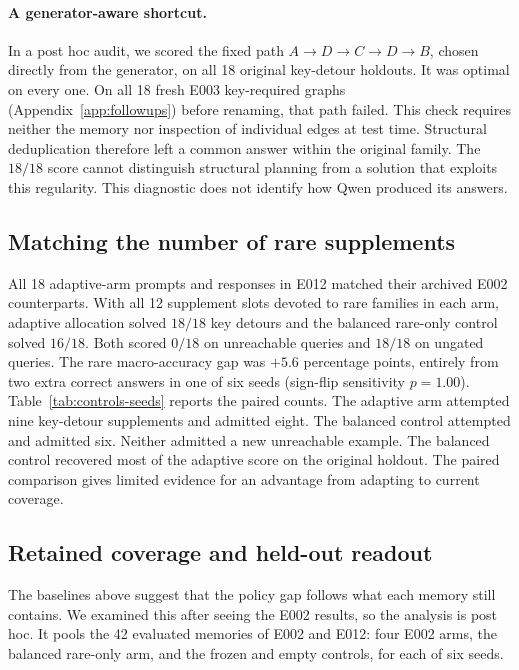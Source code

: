 \documentclass[11pt]{article}
\begin{document}
\paragraph{A generator-aware shortcut.} In a post hoc audit, we
scored the fixed path $A\to D\to C\to D\to B$, chosen directly
from the generator, on all 18 original key-detour holdouts. It was
optimal on every one. On all 18 fresh E003 key-required graphs
(Appendix~\ref{app:followups})
before renaming, that path failed. This check requires neither the
memory nor inspection of individual edges at test time. Structural
deduplication therefore left a common answer within the original
family. The $18/18$ score cannot distinguish structural planning
from a solution that exploits this regularity. This diagnostic
does not identify how Qwen produced its answers.

\subsection{Matching the number of rare supplements}

All 18 adaptive-arm prompts and responses in E012 matched their
archived E002 counterparts. With all
12 supplement slots devoted to rare families in each arm, adaptive
allocation solved $18/18$ key detours and the balanced rare-only
control solved $16/18$. Both scored $0/18$ on unreachable queries
and $18/18$ on ungated queries. The rare macro-accuracy gap was
$+5.6$ percentage points, entirely from two extra correct answers
in one of six seeds (sign-flip sensitivity $p=1.00$).
Table~\ref{tab:controls-seeds} reports the paired counts. The adaptive
arm attempted nine key-detour supplements and admitted eight.
The balanced control attempted and admitted six. Neither admitted a
new unreachable example. The balanced control recovered most of the
adaptive score on the original holdout. The paired comparison gives
limited evidence for an advantage from adapting to current coverage.

\subsection{Retained coverage and held-out readout}

The baselines above suggest that the policy gap follows what each
memory still contains. We examined this after seeing the E002
results, so the analysis is post hoc. It pools the 42 evaluated
memories of E002 and E012: four E002 arms, the balanced rare-only arm,
and the frozen and empty controls, for each of six seeds.
\end{document}
